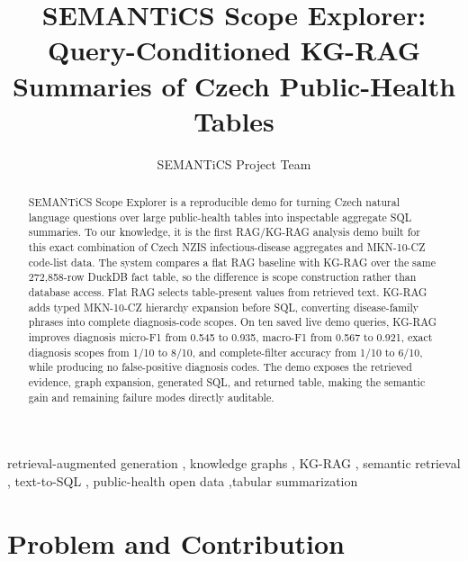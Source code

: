 \documentclass[
]{ceurart}
\begin{document}


\title{SEMANTiCS Scope Explorer: Query-Conditioned KG-RAG Summaries of Czech Public-Health Tables}

\author[1]{SEMANTiCS Project Team}
\address[1]{SEMANTiCS project workspace}

\begin{abstract}
SEMANTiCS Scope Explorer is a reproducible demo for turning Czech natural
language questions over large public-health tables into inspectable aggregate
SQL summaries. To our knowledge, it is the first RAG/KG-RAG analysis demo built
for this exact combination of Czech NZIS infectious-disease aggregates and
MKN-10-CZ code-list data. The system compares a flat RAG baseline with KG-RAG
over the same 272,858-row DuckDB fact table, so the difference is scope
construction rather than database access. Flat RAG selects table-present
values from retrieved text. KG-RAG adds typed MKN-10-CZ hierarchy expansion
before SQL, converting disease-family phrases into complete diagnosis-code
scopes. On ten saved live demo queries, KG-RAG
improves diagnosis micro-F1 from 0.545 to 0.935, macro-F1 from 0.567 to
0.921, exact diagnosis scopes from 1/10 to 8/10, and complete-filter accuracy
from 1/10 to 6/10, while producing no false-positive diagnosis codes. The demo
exposes the retrieved evidence, graph expansion, generated SQL, and returned
table, making the semantic gain and remaining failure modes directly auditable.
\end{abstract}

\begin{keywords}
retrieval-augmented generation \sep
knowledge graphs \sep
KG-RAG \sep
semantic retrieval \sep
text-to-SQL \sep
public-health open data
\sep tabular summarization
\end{keywords}

\maketitle

\section{Problem and Contribution}
\end{document}
